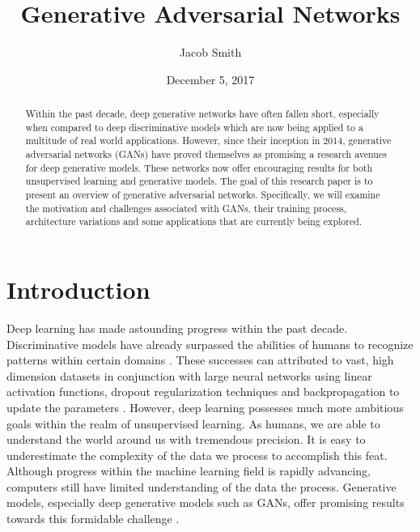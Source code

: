 \documentclass[11pt]{article}
\title{Generative Adversarial Networks}
\author{Jacob Smith}
\date{December 5, 2017}
\begin{document}
\maketitle

\begin{abstract}
    Within the past decade, deep generative networks have often fallen short, especially when compared to deep discriminative models which are now being applied to a multitude of real world applications. However, since their inception in 2014, generative adversarial networks (GANs) have proved themselves as promising a research avenues for deep generative models. These networks now offer encouraging results for both unsupervised learning and generative models. The goal of this research paper is to present an overview of generative adversarial networks. Specifically, we will examine the motivation and challenges associated with GANs, their training process, architecture variations and some applications that are currently being explored.
\end{abstract}



\section{Introduction}
Deep learning has made astounding progress within the past decade. Discriminative models have already surpassed the abilities of humans to recognize patterns within certain domains \citep{2014arXiv1404.7828S}. These successes can attributed to vast, high dimension datasets in conjunction with large neural networks using linear activation functions, dropout regularization techniques and backpropagation to update the parameters \citep{2014arXiv1406.2661G}. However, deep learning possesses much more ambitious goals within the realm of unsupervised learning. As humans, we are able to understand the world around us with tremendous precision. It is easy to underestimate the complexity of the data we process to accomplish this feat. Although progress within the machine learning field is rapidly advancing, computers still have limited understanding of the data the process. Generative models, especially deep generative models such as GANs, offer promising results towards this formidable challenge \citep{genmodelingopenai}.
\end{document}
